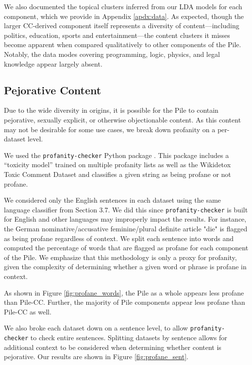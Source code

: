 We also documented the topical clusters inferred from our LDA models for each component, which we provide in Appendix \ref{apdx:data}. As expected, though the larger CC-derived component itself represents a diversity of content---including politics, education, sports and entertainment---the content clusters it misses become apparent when compared qualitatively to other components of the Pile. Notably, the data modes covering programming, logic, physics, and legal knowledge appear largely absent.

\subsection{Pejorative Content} Due to the wide diversity in origins, it is possible for the Pile to contain pejorative, sexually explicit, or otherwise objectionable content. As this content may not be desirable for some use cases, we break down profanity on a per-dataset level.

We used the \texttt{profanity-checker} Python package \cite{profanity-checker}. This package includes a ``toxicity model'' trained on multiple profanity lists as well as the Wikidetox Toxic Comment Dataset \citep{wiki-detox} and classifies a given string as being profane or not profane.

We considered only the English sentences in each dataset using the same language classifier from Section 3.7. We did this since \texttt{profanity-checker} is built for English and other languages may improperly impact the results. For instance, the German nominative/accusative feminine/plural definite article "die" is flagged as being profane regardless of context. We split each sentence into words and computed the percentage of words that are flagged as profane for each component of the Pile. We emphasize that this methodology is only a proxy for profanity, given the complexity of determining whether a given word or phrase is profane in context.

As shown in Figure \ref{fig:profane_words}, the Pile as a whole appears less profane than Pile-CC. Further, the majority of Pile components appear less profane than Pile-CC as well.

We also broke each dataset down on a sentence level, to allow \texttt{profanity-checker} to check entire sentences. Splitting datasets by sentence allows for additional context to be considered when determining whether content is pejorative. Our results are shown in Figure  \ref{fig:profane_sent}.

